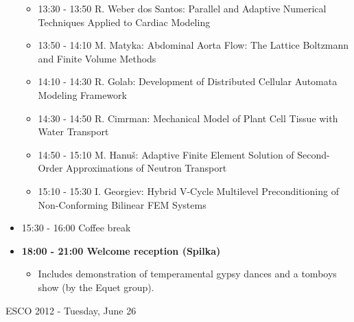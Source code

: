 \documentclass[10pt, A4]{article}%
\begin{document}
\begin{itemize}
\begin{itemize}
    \item 13:30 - 13:50 R. Weber dos Santos: Parallel and Adaptive Numerical Techniques Applied to Cardiac Modeling
    \item 13:50 - 14:10 M. Matyka: Abdominal Aorta Flow: The Lattice Boltzmann and Finite Volume Methods
    \item 14:10 - 14:30 R. Golab: Development of Distributed Cellular Automata Modeling Framework
    \item 14:30 - 14:50 R. Cimrman: Mechanical Model of Plant Cell Tissue with Water Transport
    \item 14:50 - 15:10 M. Hanu\v{s}: Adaptive Finite Element Solution of Second-Order Approximations of Neutron Transport
    \item 15:10 - 15:30 I. Georgiev: Hybrid V-Cycle Multilevel Preconditioning of Non-Conforming Bilinear FEM Systems
  \end{itemize}
  \item 15:30 - 16:00 Coffee break
  \item {\bf 18:00 - 21:00 Welcome reception (Spilka)} 
  \begin{itemize}
     \item Includes demonstration of temperamental gypsy dances and a tomboys show (by the Equet group).
  \end{itemize}
\end{itemize}

\newpage

\centerline{\huge ESCO 2012 - Tuesday, June 26}
\vspace{4mm}
\end{document}
